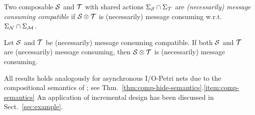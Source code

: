 
\begin{definition}[Compatibility]\label{def:compatibility}
Two composable \MAIOTSs $\S$ and $\T$ with shared actions  $\Sigma_\S \cap \Sigma_\T$ are \emph{(necessarily) message consuming compatible} if $\S \compos \T$  is (necessarily) message consuming w.r.t.\ $\Sigma_\pnN \cap \Sigma_\M$.
\end{definition}

\begin{theorem}\label{thm:inc-design-tgc}
Let $\S$ and $\T$ be (necessarily) message consuming compatible. 
If both $\S$ and $\T$ are (necessarily) message consuming, then $\S \compos \T$ is (necessarily) message consuming.
\end{theorem}


All results holds analogously for asynchronous I/O-Petri nets due to the compositional semantics of \MAIOPNs;
see Thm.~\ref{thm:comp-hide-semantics}.\ref{item:comp-semantics}
An application of incremental design has been discussed in Sect.~\ref{sec:example}. 


